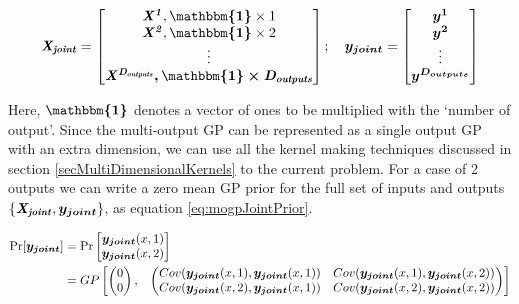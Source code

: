 \begin{equation}\label{eqMTGPDimension}
    \myMatrix{X_{joint}} = \begin{bmatrix}
\myMatrix{X^1}, \VEC{\mathbbm{1}} \times 1\\ 
\myMatrix{X^2}, \VEC{\mathbbm{1}} \times 2\\ 
\vdots\\ 
\myMatrix{X^{D_{outputs}}, \VEC{\mathbbm{1}} \times D_{outputs}}
\end{bmatrix} ; \quad 
\VEC{y_{joint}} = \begin{bmatrix}
\VEC{y^1}\\ 
\VEC{y^2}\\ 
\vdots\\ 
\VEC{y^{D_{outputs}}}
\end{bmatrix}
\end{equation}

Here, $\VEC{\mathbbm{1}}$ denotes a vector of ones to be multiplied with the `number of output'. Since the multi-output GP can be represented as a single output GP with an extra dimension, we can use all the kernel making techniques discussed in section \ref{secMultiDimensionalKernels} to the current problem. For a case of 2 outputs we can write a zero mean GP prior for the full set of inputs and outputs $\{\bm{\mathit{X_{joint}}}, \boldsymbol{y_{joint}}\}$, as equation \ref{eq:mogpJointPrior}. 

\begin{equation}\label{eq:mogpJointPrior}
\begin{aligned}
       \Pr[\boldsymbol{y_{joint}}] & = \Pr\begin{bmatrix}   \boldsymbol{y_{joint}}(x, 1) \\ \boldsymbol{y_{joint}}(x, 2)   \end{bmatrix} \\
& = GP\begin{bmatrix}
   \begin{pmatrix}
   0\\ 
   0
   \end{pmatrix} ,& 
   \begin{pmatrix}
    Cov(\boldsymbol{y_{joint}}(x, 1), \boldsymbol{y_{joint}}(x, 1))  & Cov(\boldsymbol{y_{joint}}(x, 1), \boldsymbol{y_{joint}}(x, 2))\\ 
    Cov(\boldsymbol{y_{joint}}(x, 2), \boldsymbol{y_{joint}}(x, 1))     & Cov(\boldsymbol{y_{joint}}(x, 2), \boldsymbol{y_{joint}}(x, 2))
   \end{pmatrix}
   \end{bmatrix}
\end{aligned}
   \end{equation}

